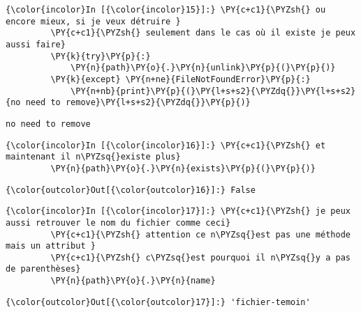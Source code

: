     \begin{Verbatim}[commandchars=\\\{\},frame=single,framerule=0.3mm,rulecolor=\color{cellframecolor}]
{\color{incolor}In [{\color{incolor}15}]:} \PY{c+c1}{\PYZsh{} ou encore mieux, si je veux détruire }
         \PY{c+c1}{\PYZsh{} seulement dans le cas où il existe je peux aussi faire}
         \PY{k}{try}\PY{p}{:} 
             \PY{n}{path}\PY{o}{.}\PY{n}{unlink}\PY{p}{(}\PY{p}{)}
         \PY{k}{except} \PY{n+ne}{FileNotFoundError}\PY{p}{:}
             \PY{n+nb}{print}\PY{p}{(}\PY{l+s+s2}{\PYZdq{}}\PY{l+s+s2}{no need to remove}\PY{l+s+s2}{\PYZdq{}}\PY{p}{)}
\end{Verbatim}


    \begin{Verbatim}[commandchars=\\\{\},frame=single,framerule=0.3mm,rulecolor=\color{cellframecolor}]
no need to remove
\end{Verbatim}

    \begin{Verbatim}[commandchars=\\\{\},frame=single,framerule=0.3mm,rulecolor=\color{cellframecolor}]
{\color{incolor}In [{\color{incolor}16}]:} \PY{c+c1}{\PYZsh{} et maintenant il n\PYZsq{}existe plus}
         \PY{n}{path}\PY{o}{.}\PY{n}{exists}\PY{p}{(}\PY{p}{)}
\end{Verbatim}


\begin{Verbatim}[commandchars=\\\{\},frame=single,framerule=0.3mm,rulecolor=\color{cellframecolor}]
{\color{outcolor}Out[{\color{outcolor}16}]:} False
\end{Verbatim}
            
    \begin{Verbatim}[commandchars=\\\{\},frame=single,framerule=0.3mm,rulecolor=\color{cellframecolor}]
{\color{incolor}In [{\color{incolor}17}]:} \PY{c+c1}{\PYZsh{} je peux aussi retrouver le nom du fichier comme ceci}
         \PY{c+c1}{\PYZsh{} attention ce n\PYZsq{}est pas une méthode mais un attribut }
         \PY{c+c1}{\PYZsh{} c\PYZsq{}est pourquoi il n\PYZsq{}y a pas de parenthèses}
         \PY{n}{path}\PY{o}{.}\PY{n}{name}
\end{Verbatim}


\begin{Verbatim}[commandchars=\\\{\},frame=single,framerule=0.3mm,rulecolor=\color{cellframecolor}]
{\color{outcolor}Out[{\color{outcolor}17}]:} 'fichier-temoin'
\end{Verbatim}
            
